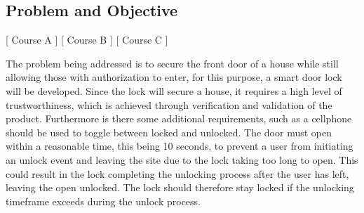 \subsection{Problem and Objective}
[ Course A ] [ Course B ] [ Course C ] 
\newline
[ Casper ] [ Author B ] [ Author C ] 
\newline






The problem being addressed is to secure the front door of a house while still allowing those with authorization to enter, for this purpose, a smart door lock will be developed.
Since the lock will secure a house, it requires a high level of trustworthiness, which is achieved through verification and validation of the product.
Furthermore is there some additional requirements, such as a cellphone should be used to toggle between locked and unlocked.
The door must open within a reasonable time, this being 10 seconds, to prevent a user from initiating an unlock event and leaving the site due to the lock taking too long to open.
This could result in the lock completing the unlocking process after the user has left, leaving the open unlocked.
The lock should therefore stay locked if the unlocking timeframe exceeds during the unlock process.